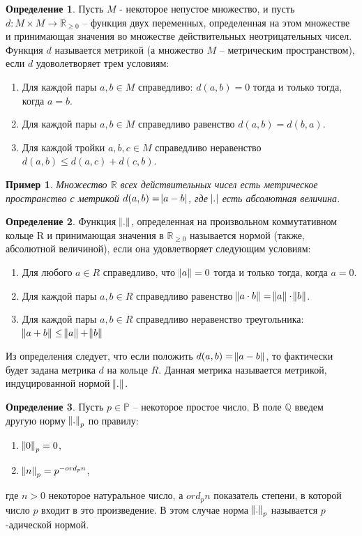 \documentclass[master, och, diploma, times]{sty/SCWorks}
\theoremstyle{plain}
\newtheorem{exmp}{Пример}[section]
\theoremstyle{definition}
\newtheorem{defn}{Определение}[section]
\numberwithin{equation}{section}
\begin{document}
\begin{defn}
Пусть $M$ - некоторое непустое множество, и пусть \linebreak ${d: M \times M \rightarrow \mathbb {R}_{\ge0}}$ -- функция двух переменных, определенная на этом множестве и принимающая значения во множестве действительных неотрицательных чисел. Функция $d$ называется метрикой (а множество $M$ -- метрическим пространством), если $d$ удоволетворяет трем условиям:

\begin{enumerate} 
	\item Для каждой пары $a, b \in M$ справедливо: $d(a, b)=0$ тогда и только тогда, когда $a=b$.
	\item Для каждой пары $a, b \in M$ справедливо равенство $d(a, b) = d(b, a)$.
	\item Для каждой тройки $a, b, c \in M$ справедливо неравенство $d(a, b) \le d(a, c) + d(c, b)$.
\end{enumerate}
\end{defn}

\begin{exmp}
Множество $\mathbb {R}$ всех действительных чисел есть метрическое пространство с метрикой $d(a, b)= \abs{a-b}$, где $\abs{.}$ есть абсолютная величина.
\end{exmp}


\begin{defn}
Функция $\norm{.}$, определенная на произвольном коммутативном кольце R и принимающая значения в $\mathbb {R}_{\ge 0}$ называется нормой (также, абсолютной величиной), если она удовлетворяет следующим условиям:

\begin{enumerate} 
	\item Для любого $a \in R$ справедливо, что $\norm{a}=0$ тогда и только тогда, когда $a=0$.
	\item Для каждой пары $a, b \in R$ справедливо равенство $\norm{a \cdot b} = \norm{a} \cdot \norm{b}$.
	\item Для каждой пары $a, b \in R$ справедливо неравенство треугольника: $\norm{a + b} \le \norm{a} + \norm{b}$
\end{enumerate}
\end{defn}

Из определения следует, что если положить $d(a, b)= \norm{a - b}$, то фактически будет задана метрика $d$ на кольце $R$. Данная метрика называется метрикой, индуцированной нормой $\norm{.}$.

\begin{defn}
Пусть $p \in \mathbb {P}$ -- некоторое простое число. В поле $\mathbb {Q}$ введем другую норму $\norm{.}_p$ по правилу:

\begin{enumerate} 
	\item $\norm{0}_p = 0$,
	\item $\norm{n}_p = p ^ {-ord_pn}$,
\end{enumerate}

\noindent где $n > 0$ некоторое натуральное число, а $ord_pn$ показатель степени, в которой число $p$ входит в это произведение. В этом случае норма $\norm{.}_p$ называется $p$-адической нормой.
\end{defn}
\end{document}
